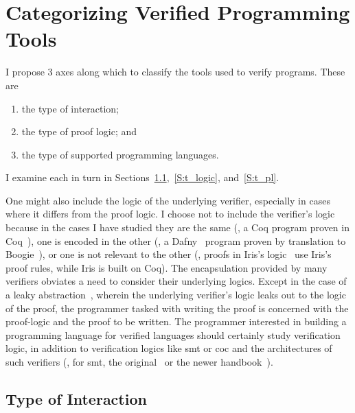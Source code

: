 \section{Categorizing Verified Programming Tools}\label{S:categories}

I propose 3 axes along which to classify the tools used to verify programs.
These are
\begin{enumerate}
    \item the type of interaction;
    \item the type of proof logic; and
    \item the type of supported programming languages.
\end{enumerate}

I examine each in turn in Sections~\ref{S:t_interaction},~\ref{S:t_logic},
and~\ref{S:t_pl}.

One might also include the logic of the underlying verifier, especially in cases
where it differs from the proof logic. I choose not to include the verifier's
logic because in the cases I have studied they are the same (\eg, a Coq program
proven in Coq~\cite{Coq}), one is encoded in the other (\eg, a
Dafny~\cite{leino2010dafny} program proven by translation to
Boogie~\cite{Barnett_2006,leino2008this}), or one is not relevant to the other
(\eg, proofs in Iris's logic~\cite{Jung_2018b} use Iris's proof rules, while
Iris is built on Coq). The encapsulation provided by many verifiers obviates a
need to consider their underlying logics. Except in the case of a leaky
abstraction~\cite{Spolsky_2002}, wherein the underlying verifier's logic leaks
out to the logic of the proof, the programmer tasked with writing the proof is
concerned with the proof-logic and the proof to be written. The
programmer interested in building a programming language for verified languages
should certainly study verification logic, in addition to verification logics
like \gls{smt} or \gls{coc} and the architectures of such verifiers (\eg, for
\gls{smt}, the original~\cite{Davis_1960,Davis_1962} or the newer
handbook~\cite{biere2009handbook}).

\subsection{Type of Interaction}\label{S:t_interaction}

